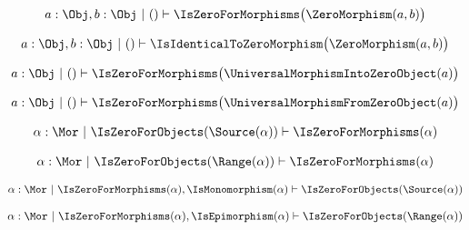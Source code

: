 \begin{sequent}
\begin{align*}
   a: \Obj, b: \Obj ~|~ () \vdash \IsZeroForMorphisms \big( \ZeroMorphism( a, b ) \big)
\end{align*}
\end{sequent}

\begin{sequent}
\begin{align*}
   a: \Obj, b: \Obj ~|~ () \vdash \IsIdenticalToZeroMorphism \big( \ZeroMorphism( a, b ) \big)
\end{align*}
\end{sequent}

\begin{sequent}
\begin{align*}
   a: \Obj ~|~ () \vdash \IsZeroForMorphisms \big( \UniversalMorphismIntoZeroObject( a ) \big)
\end{align*}
\end{sequent}

\begin{sequent}
\begin{align*}
   a: \Obj ~|~ () \vdash \IsZeroForMorphisms \big( \UniversalMorphismFromZeroObject( a ) \big)
\end{align*}
\end{sequent}

\begin{sequent}
\begin{align*}
   \alpha: \Mor ~|~ \IsZeroForObjects(\Source(\alpha)) \vdash \IsZeroForMorphisms(\alpha)
\end{align*}
\end{sequent}

\begin{sequent}
\begin{align*}
   \alpha: \Mor ~|~ \IsZeroForObjects(\Range(\alpha)) \vdash \IsZeroForMorphisms(\alpha)
\end{align*}
\end{sequent}

\begin{sequent}
\begin{align*}
   \alpha: \Mor ~|~ \IsZeroForMorphisms(\alpha), \IsMonomorphism(\alpha) \vdash \IsZeroForObjects(\Source(\alpha))
\end{align*}
\end{sequent}

\begin{sequent}
\begin{align*}
   \alpha: \Mor ~|~ \IsZeroForMorphisms(\alpha), \IsEpimorphism(\alpha) \vdash \IsZeroForObjects(\Range(\alpha))
\end{align*}
\end{sequent}

